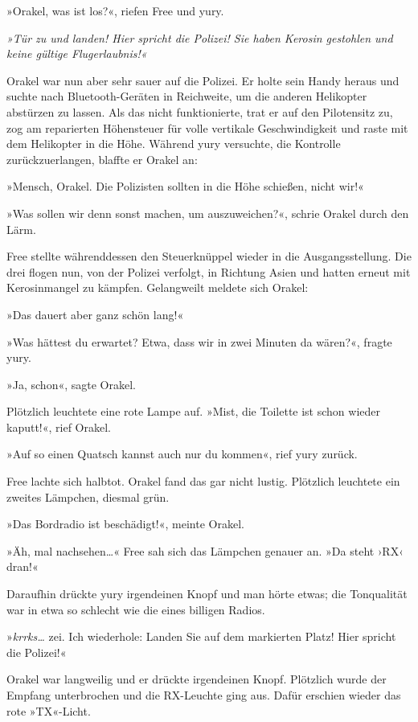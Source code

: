 »Orakel, was ist los?«, riefen Free und yury.

\textit{»Tür zu und landen! Hier spricht die Polizei! Sie haben Kerosin gestohlen und keine gültige Flugerlaubnis!«}

Orakel war nun aber sehr sauer auf die Polizei. Er holte sein Handy heraus und suchte nach Bluetooth-Geräten in Reichweite, um die anderen Helikopter abstürzen zu lassen. Als das nicht funktionierte, trat er auf den Pilotensitz zu, zog am reparierten Höhensteuer für volle vertikale Geschwindigkeit und raste mit dem Helikopter in die Höhe. Während yury versuchte, die Kontrolle zurückzuerlangen, blaffte er Orakel an:

»Mensch, Orakel. Die Polizisten sollten in die Höhe schießen, nicht wir!«

»Was sollen wir denn sonst machen, um auszuweichen?«, schrie Orakel durch den Lärm.

Free stellte währenddessen den Steuerknüppel wieder in die Ausgangsstellung. Die drei flogen nun, von der Polizei verfolgt, in Richtung Asien und hatten erneut mit Kerosinmangel zu kämpfen. Gelangweilt meldete sich Orakel:

»Das dauert aber ganz schön lang!«

»Was hättest du erwartet? Etwa, dass wir in zwei Minuten da wären?«, fragte yury.

»Ja, schon«, sagte Orakel.

Plötzlich leuchtete eine rote Lampe auf. »Mist, die Toilette ist schon wieder kaputt!«, rief Orakel.

»Auf so einen Quatsch kannst auch nur du kommen«, rief yury zurück.

Free lachte sich halbtot. Orakel fand das gar nicht lustig. Plötzlich leuchtete ein zweites Lämpchen, diesmal grün.

»Das Bordradio ist beschädigt!«, meinte Orakel.

»Äh, mal nachsehen…« Free sah sich das Lämpchen genauer an. »Da steht ›RX‹ dran!«

Daraufhin drückte yury irgendeinen Knopf und man hörte etwas; die Tonqualität war in etwa so schlecht wie die eines billigen Radios.

»\textit{krrks…} zei. Ich wiederhole: Landen Sie auf dem markierten Platz! Hier spricht die Polizei!«

Orakel war langweilig und er drückte irgendeinen Knopf. Plötzlich wurde der Empfang unterbrochen und die RX-Leuchte ging aus. Dafür erschien wieder das rote »TX«-Licht.

